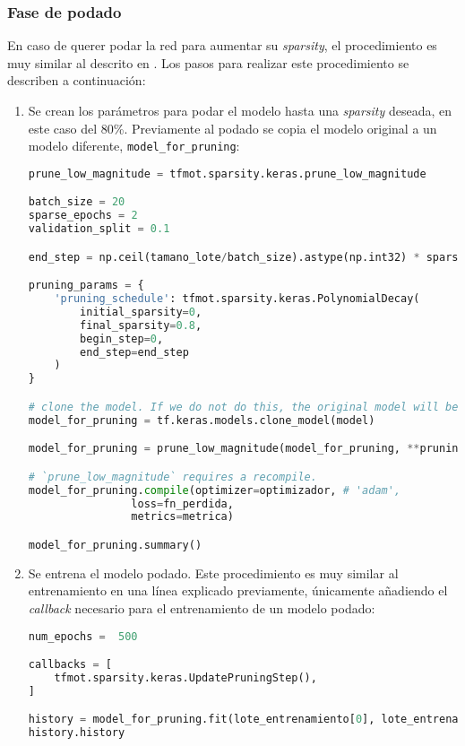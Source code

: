 \subsubsection{Fase de podado}
\label{sssec:modelo_pruebas_fase_podado}
En caso de querer podar la red para aumentar su \textit{sparsity}, el procedimiento es muy similar al descrito en \cite{tensorflow_prune_model}. Los pasos para realizar este procedimiento se describen a continuación:
\begin{enumerate}
    \item Se crean los parámetros para podar el modelo hasta una \textit{sparsity} deseada, en este caso del 80\%. Previamente al podado se copia el modelo original a un modelo diferente, \texttt{model\_for\_pruning}:\medskip
\begin{lstlisting}[language=Python]
prune_low_magnitude = tfmot.sparsity.keras.prune_low_magnitude

batch_size = 20
sparse_epochs = 2
validation_split = 0.1

end_step = np.ceil(tamano_lote/batch_size).astype(np.int32) * sparse_epochs

pruning_params = {
    'pruning_schedule': tfmot.sparsity.keras.PolynomialDecay(
        initial_sparsity=0,                                                    
        final_sparsity=0.8,
        begin_step=0,
        end_step=end_step
    )
}

# clone the model. If we do not do this, the original model will be altered too
model_for_pruning = tf.keras.models.clone_model(model)

model_for_pruning = prune_low_magnitude(model_for_pruning, **pruning_params)

# `prune_low_magnitude` requires a recompile.
model_for_pruning.compile(optimizer=optimizador, # 'adam',
                loss=fn_perdida,
                metrics=metrica)

model_for_pruning.summary()
\end{lstlisting}
    \item Se entrena el modelo podado. Este procedimiento es muy similar al entrenamiento en una línea explicado previamente, únicamente añadiendo el \textit{callback} necesario para el entrenamiento de un modelo podado:\medskip
\begin{lstlisting}[language=Python]
num_epochs =  500

callbacks = [
    tfmot.sparsity.keras.UpdatePruningStep(),
]

history = model_for_pruning.fit(lote_entrenamiento[0], lote_entrenamiento[1], batch_size=batch_size, epochs=num_epochs, validation_split=validation_split, callbacks=callbacks)
history.history
\end{lstlisting}
\end{enumerate}

